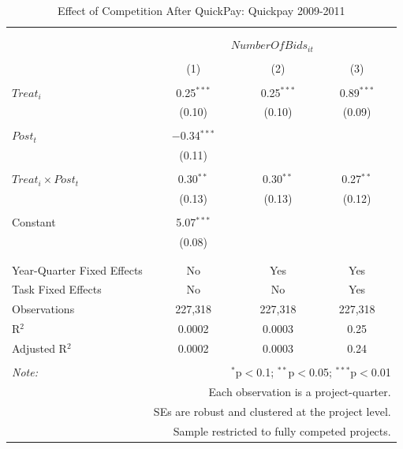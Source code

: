 \documentclass[]{article}
\begin{document}
\begin{table}[H] \centering 
  \caption{Effect of Competition After QuickPay: Quickpay 2009-2011} 
  \label{} 
\small 
\begin{tabular}{@{\extracolsep{-2pt}}lccc} 
\\[-1.8ex]\hline 
\hline \\[-1.8ex] 
\\[-1.8ex] & \multicolumn{3}{c}{$NumberOfBids_{it}$} \\ 
\\[-1.8ex] & (1) & (2) & (3)\\ 
\hline \\[-1.8ex] 
 $Treat_i$ & 0.25$^{***}$ & 0.25$^{***}$ & 0.89$^{***}$ \\ 
  & (0.10) & (0.10) & (0.09) \\ 
  & & & \\ 
 $Post_t$ & $-$0.34$^{***}$ &  &  \\ 
  & (0.11) &  &  \\ 
  & & & \\ 
 $Treat_i \times Post_t$ & 0.30$^{**}$ & 0.30$^{**}$ & 0.27$^{**}$ \\ 
  & (0.13) & (0.13) & (0.12) \\ 
  & & & \\ 
 Constant & 5.07$^{***}$ &  &  \\ 
  & (0.08) &  &  \\ 
  & & & \\ 
\hline \\[-1.8ex] 
Year-Quarter Fixed Effects & No & Yes & Yes \\ 
Task Fixed Effects & No & No & Yes \\ 
Observations & 227,318 & 227,318 & 227,318 \\ 
R$^{2}$ & 0.0002 & 0.0003 & 0.25 \\ 
Adjusted R$^{2}$ & 0.0002 & 0.0003 & 0.24 \\ 
\hline 
\hline \\[-1.8ex] 
\textit{Note:}  & \multicolumn{3}{r}{$^{*}$p$<$0.1; $^{**}$p$<$0.05; $^{***}$p$<$0.01} \\ 
 & \multicolumn{3}{r}{Each observation is a project-quarter.} \\ 
 & \multicolumn{3}{r}{SEs are robust and clustered at the project level.} \\ 
 & \multicolumn{3}{r}{Sample restricted to fully competed projects.} \\ 
\end{tabular} 
\end{table}
\end{document}
